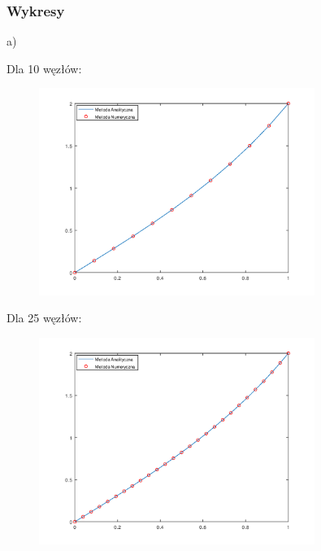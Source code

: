 \begin{samepage}
    
\end{samepage}

\newpage
\subsubsection{Wykresy}

a)\\
\begin{samepage}
Dla 10 węzłów:

    
    
\FloatBarrier
\begin{figure}[!ht]
    \begin{center}
        \includegraphics[width=0.8\textwidth]{Lab4/charts/zad1/zad1_n_10.png}
    \end{center}
\end{figure}
\FloatBarrier
\end{samepage}

\begin{samepage}
Dla 25 węzłów:
\begin{figure}[!ht]
    \begin{center}
\includegraphics[width=0.8\textwidth]{Lab4/charts/zad1/zad1_n_25.png}
    \end{center}
\end{figure}
\FloatBarrier
\end{samepage}

